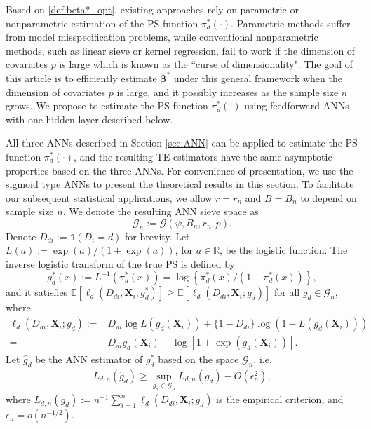 \documentclass[11pt]{article}
\numberwithin{equation}{section}
\begin{document}
Based on \eqref{def:beta*_opt}, existing approaches  rely on parametric or nonparametric estimation of the PS function $\pi^*_d(\cdot)$. Parametric methods suffer from model misspecification problems, while conventional nonparametric methods, such as linear sieve or kernel regression, fail to work if the dimension of covariates $p$ is large  which is known as the ``curse of dimensionality".
The goal of this article is to efficiently estimate $\boldsymbol{\beta}^*$ under this general framework when the dimension of covariates $p$ is large, and it possibly increases as the sample size $n$ grows. We propose to estimate the PS function $\pi^*_d(\cdot)$ using feedforward ANNs with one hidden layer described below.



All three ANNs described in Section \ref{sec:ANN} can be applied to estimate the  PS function $\pi_d^*(\cdot)$, and the resulting TE estimators have the same asymptotic properties based on the three ANNs. For convenience of presentation, we use the sigmoid type ANNs to present the theoretical results in this section.  To facilitate our subsequent statistical applications, we allow  $r=r_n$ and $B=B_n$ to depend on sample size $n$.  We denote the resulting ANN sieve space as
$$\mathcal{G}_n:=\mathcal{G}(\psi,B_n,r_n,p).$$
Denote $D_{di}:=\mathds{1}(D_i=d)$ for brevity.  Let $L(a):=\exp(a)/(1+\exp(a))$, for $a\in\mathbb{R}$, be the logistic function. The  inverse logistic transform of the true PS is defined by $$g_d^*(x):=L^{-1}\left(\pi_d^*(x)\right)=\log\left\{\pi_d^*(x)/(1-\pi_d^*(x))\right\},$$ and it satisfies $\mathbb{E}[\ell_d(D_{di},\boldsymbol{X}_{i};g^*_d)]\geq \mathbb{E}[\ell_d(D_{di},\boldsymbol{X}_{i};g_d)]$ for all $g_d\in\mathcal{G}_n$, where
\begin{align*}
	\ell_d(D_{di},\boldsymbol{X}_{i};g_d):=&D_{di}\log L\left(g_d(\boldsymbol{X}_{i})\right)+\{1-D_{di}\}\log \left(1-L\left(g_d(\boldsymbol{X}_{i})\right)\right)\\
	=&D_{di}g_d(\boldsymbol{X}_i)-\log\left[1+\exp(g_d(\boldsymbol{X}_i))\right].
\end{align*}		
Let $\widehat{g}_d$ be the ANN estimator of $g_d^*$ based on the space $\mathcal{G}_n$, i.e.
\begin{align}\label{as:pihat_1st}
	L_{d,n}(\widehat{g}_d)\geq \sup_{g_d\in\mathcal{G}_n}L_{d,n}(g_d)-O(\epsilon^2_n),
\end{align}
where
$L_{d,n}(g_d):=n^{-1}\sum_{i=1}^n\ell_d(D_{di},\boldsymbol{X}_{i};g_d)$
is the empirical criterion, and $\epsilon_n=o(n^{-1/2})$.
\end{document}
